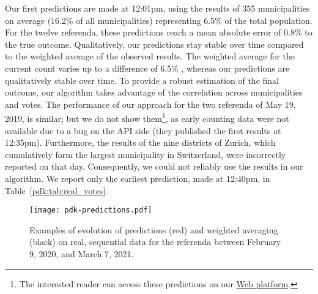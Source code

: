 Our first predictions are made at 12:01pm, using the results of 355 municipalities on average (16.2\% of all municipalities) representing 6.5\% of the total population.
For the twelve referenda, these predictions reach a mean absolute error of 0.8\% to the true outcome.
Qualitatively, our predictions stay stable over time compared to the weighted average of the observed results.
The weighted average for the current count varies up to a difference of 6.5\% , whereas our predictions are qualitatively stable over time.
To provide a robust estimation of the final outcome, our algorithm takes advantage of the correlation across municipalities and votes.
The performance of our approach for the two referenda of May 19, 2019, is similar; but we do not show them\footnote{The interested reader can access these predictions on our \href{http://www.predikon.ch}{Web platform}.}, as early counting data were not available due to a bug on the API side (they published the first results at 12:35pm).
Furthermore, the results of the nine districts of Zurich, which cumulatively form the largest municipality in Switzerland, were incorrectly reported on that day.
Consequently, we could not reliably use the results in our algorithm.
We report only the earliest prediction, made at 12:40pm, in Table~\ref{pdk:tab:real_votes}.

\begin{figure}
	\centering
	\texttt{[image: pdk-predictions.pdf]}
	\caption{
		Examples of evolution of predictions (red) and weighted averaging (black) on real, sequential data for the referenda between February 9, 2020, and March 7, 2021.
	}
	\label{pdk:fig:predictions}
\end{figure}

